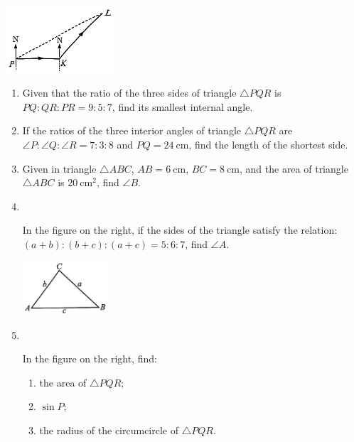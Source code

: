 \documentclass{report}
\begin{document}
\begin{enumerate}
{\begin{vwcol}[widths={0.6,0.4}, sep=8mm, rule=0pt]
                \includegraphics[width=0.3\textwidth]{assets/10-74.jpg}
            \end{vwcol}
        }
    \end{enumerate}

    \begin{enumerate}
        \item Given that the ratio of the three sides of triangle $\triangle PQR$ is $PQ:QR:PR=9:5:7$, find its smallest internal angle.
        \item If the ratios of the three interior angles of triangle $\triangle PQR$ are $\angle P:\angle Q:\angle R=7:3:8$ and $PQ=24 \mathrm{~cm}$, find the length of the shortest side.
        \item Given in triangle $\triangle ABC$, $AB=6 \mathrm{~cm}$, $BC=8 \mathrm{~cm}$, and the area of triangle $\triangle ABC$ is $20 \mathrm{~cm}^2$, find $\angle B$.
        \item \parbox[t]{0.9\textwidth}{
            ~
            \vspace{-1.1em}
            \begin{vwcol}[widths={0.6,0.4}, sep=8mm, rule=0pt]
                In the figure on the right, if the sides of the triangle satisfy the relation: $(a+b):(b+c):(a+c)=5:6:7$, find $\angle A$.
    
                \includegraphics[width=0.25\textwidth]{assets/10-75.jpg}
            \end{vwcol}
        }

        \vspace{3em}
        \item \parbox[t]{0.9\textwidth}{
            ~
            \vspace{-1.1em}
            \begin{vwcol}[widths={0.6,0.4}, sep=8mm, rule=0pt]
                In the figure on the right, find:
                
                \noindent \parbox[t]{0.5\textwidth}{
                    \begin{enumerate}
                    \item the area of $\triangle PQR$;
                    \item $\sin P$;
                    \item the radius of the circumcircle of $\triangle PQR$.
                \end{enumerate}
                }
    

\end{vwcol}}
\end{enumerate}
\end{document}
